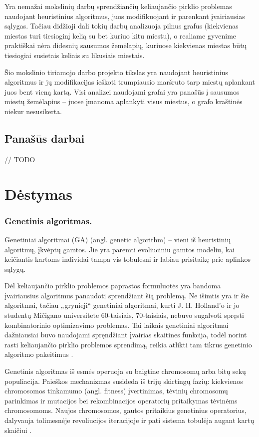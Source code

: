 \documentclass[runningheads,a4paper]{llncs}
\begin{document}
Yra nemažai mokslinių darbų sprendžiančių keliaujančio pirklio problemas naudojant heuristinius algoritmus, juos modifikuojant ir parenkant įvairiausias sąlygas. Tačiau didžioji dali tokių darbų analizuoja pilnus grafus (kiekvienas miestas turi tiesioginį kelią su bet kuriuo kitu miestu), o realiame gyvenime praktiškai nėra didesnių sausumos žemėlapių, kuriuose kiekvienas miestas būtų tiesiogiai susietais keliais su likusiais miestais.

Šio mokslinio tiriamojo darbo projekto tikslas yra naudojant heuristinius algoritmus ir jų modifikacijas ieškoti trumpiausio maršruto tarp miestų aplankant juos bent vieną kartą. Visi analizei naudojami grafai yra panašūs į sausumos miestų žemėlapius – juose įmanoma aplankyti visus miestus, o grafo kraštinės niekur nesusikerta.


\subsection{Panašūs darbai}

// TODO

\section{Dėstymas}


\subsubsection{Genetinis algoritmas.}

Genetiniai algoritmai (GA) (angl. genetic algorithm) – vieni iš heuristinių algoritmų, įkvėptų gamtos. Jie yra paremti evoliuciniu gamtos modeliu, kai keičiantis kartoms individai tampa vis tobulesni ir labiau prisitaikę prie aplinkos sąlygų.

Dėl keliaujančio pirklio problemos paprastos formuluotės yra bandoma įvairiausius algoritmus panaudoti sprendžiant šią problemą. Ne išimtis yra ir šie algoritmai, tačiau „grynieji“ genetiniai algoritmai, kurti J. H. Holland'o ir jo studentų Mičigano universitete 60-taisiais, 70-taisiais, nebuvo sugalvoti spręsti kombinatorinio optimizavimo problemas. Tai laikais genetiniai algoritmai dažniausiai buvo naudojami spręndžiant įvairias skaitines funkcija, todėl norint rasti keliaujančio pirklio problemos sprendimą, reikia atlikti tam tikrus genetinio algoritmo pakeitimus \cite{genetictsp}.

Genetinis algoritmas iš esmės operuoja su baigtine chromosomų arba bitų sekų populiacija. Paieškos mechanizmas susideda iš trijų skirtingų fazių: kiekvienos chromosomos tinkamumo (angl. fitness) įvertinimas, tėvinių chromosomų parinkimas ir mutacijos bei rekombinacijos operatorių pritaikymas tėvinėms chromosomoms. Naujos chromosomos, gautos pritaikius genetinius operatorius, dalyvauja tolimesnėje revoliucijos iteracijoje ir pati sistema tobulėja augant kartų skaičiui \cite{genetictsp}.
\end{document}
